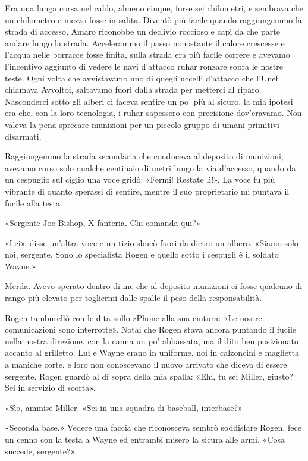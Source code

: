 \hfill\break

Era una lunga corsa nel caldo, almeno cinque, forse sei chilometri, e
sembrava che un chilometro e mezzo fosse in salita. Diventò più facile
quando raggiungemmo la strada di accesso, Amaro riconobbe un declivio
roccioso e capì da che parte andare lungo la strada. Accelerammo il
passo nonostante il calore crescesse e l'acqua nelle borracce fosse
finita, sulla strada era più facile correre e avevamo l'incentivo
aggiunto di vedere le navi d'attacco ruhar ronzare sopra le nostre
teste. Ogni volta che avvistavamo uno di quegli uccelli d'attacco che
l'Unef chiamava Avvoltoi, saltavamo fuori dalla strada per metterci al
riparo. Nasconderci sotto gli alberi ci faceva sentire un po' più al
sicuro, la mia ipotesi era che, con la loro tecnologia, i ruhar
sapessero con precisione dov'eravamo. Non valeva la pena sprecare
munizioni per un piccolo gruppo di umani primitivi disarmati.

Raggiungemmo la strada secondaria che conduceva al deposito di
munizioni; avevamo corso solo qualche centinaio di metri lungo la via
d'accesso, quando da un cespuglio sul ciglio una voce gridò: «Fermi!
Restate lì!». La voce fu più vibrante di quanto sperassi di sentire,
mentre il suo proprietario mi puntava il fucile alla testa.

«Sergente Joe Bishop, X fanteria. Chi comanda qui?»

«Lei», disse un'altra voce e un tizio sbucò fuori da dietro un albero.
«Siamo solo noi, sergente. Sono lo specialista Rogen e quello sotto i
cespugli è il soldato Wayne.»

Merda. Avevo sperato dentro di me che al deposito munizioni ci fosse
qualcuno di rango più elevato per togliermi dalle spalle il peso della
responsabilità.

Rogen tamburellò con le dita sullo zPhone alla sua cintura: «Le nostre
comunicazioni sono interrotte». Notai che Rogen stava ancora puntando il
fucile nella nostra direzione, con la canna un po' abbassata, ma il dito
ben posizionato accanto al grilletto. Lui e Wayne erano in uniforme, noi
in calzoncini e maglietta a maniche corte, e loro non conoscevano il
nuovo arrivato che diceva di essere sergente. Rogen guardò al di sopra
della mia spalla: «Ehi, tu sei Miller, giusto? Sei in servizio di
scorta».

«Sì», ammise Miller. «Sei in una squadra di baseball, interbase?»

«Seconda base.» Vedere una faccia che riconosceva sembrò soddisfare
Rogen, fece un cenno con la testa a Wayne ed entrambi misero la sicura
alle armi. «Cosa succede, sergente?»

